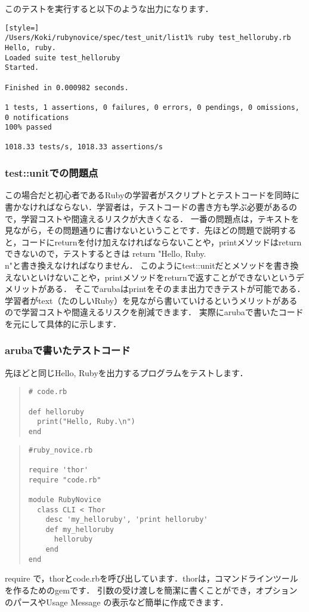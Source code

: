 このテストを実行すると以下のような出力になります．
\begin{lstlisting}[style=]
/Users/Koki/rubynovice/spec/test_unit/list1% ruby test_helloruby.rb 
Hello, ruby.
Loaded suite test_helloruby
Started.

Finished in 0.000982 seconds.

1 tests, 1 assertions, 0 failures, 0 errors, 0 pendings, 0 omissions, 0 notifications
100% passed

1018.33 tests/s, 1018.33 assertions/s
\end{lstlisting}
\subsubsection{test::unitでの問題点}
この場合だと初心者であるRubyの学習者がスクリプトとテストコードを同時に書かなければならない．学習者は，テストコードの書き方も学ぶ必要があるので，学習コストや間違えるリスクが大きくなる．
一番の問題点は，テキストを見ながら，その問題通りに書けないということです．先ほどの問題で説明すると，コードにreturnを付け加えなければならないことや，printメソッドはreturnできないので，テストするときは return "Hello, Ruby.\\n"と書き換えなければなりません．
このようにtest::unitだとメソッドを書き換えないといけないことや，printメソッドをreturnで返すことができないというデメリットがある．
そこでarubaはprintをそのまま出力できテストが可能である．学習者がtext（たのしいRuby）を見ながら書いていけるというメリットがあるので学習コストや間違えるリスクを削減できます．
実際にarubaで書いたコードを元にして具体的に示します．

\subsubsection{arubaで書いたテストコード}
先ほどと同じHello, Rubyを出力するプログラムをテストします．
\begin{quote}\begin{verbatim}
# code.rb

def helloruby    
  print("Hello, Ruby.\n")
end
\end{verbatim}\end{quote}\begin{quote}\begin{verbatim}
#ruby_novice.rb

require 'thor'                                                                         
require "code.rb"

module RubyNovice
  class CLI < Thor
    desc 'my_helloruby', 'print helloruby'
    def my_helloruby
      helloruby
    end
end
\end{verbatim}\end{quote}
require で，thorとcode.rbを呼び出しています．thorは，コマンドラインツールを作るためのgemです．
引数の受け渡しを簡潔に書くことができ，オプションのパースやUsage Message の表示など簡単に作成できます．

